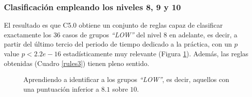 \subsubsection{Clasificación empleando los niveles 8, 9 y 10}

El resultado es que C5.0 obtiene un conjunto de reglas capaz de clasificar exactamente los $36$ casos de grupos \emph{``LOW''} del nivel $8$ en adelante, es decir, a partir del último tercio del periodo de tiempo dedicado a la práctica, con un $p$ value $p < 2.2e-16$ estadísticamente muy relevante (Figura \ref{fig:cm3}). Además, las reglas obtenidas (Cuadro \ref{rules3}) tienen pleno sentido.

\begin{figure}[H]
\centering
{}
\caption{Aprendiendo a identificar a los grupos \emph{``LOW''}, es decir, aquellos con una puntuación inferior a $8.1$ sobre $10$.}
\label{fig:cm3}
\end{figure}

